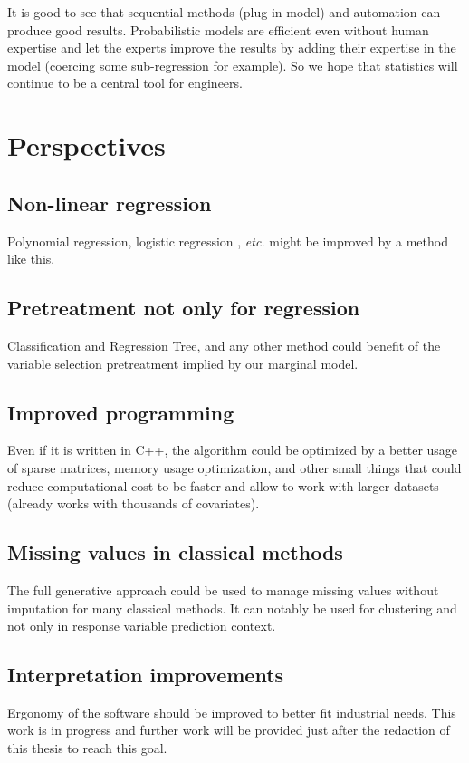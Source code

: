 \documentclass[12pt,a4paper]{report}
\begin{document}
			It is good to see that sequential methods (plug-in model) and automation can produce good results. Probabilistic models are efficient even without human expertise and let the experts improve the results by adding their expertise in the model (coercing some sub-regression for example). So we hope that statistics will continue to be a central tool for engineers.
		
		
	\section{Perspectives}
		\subsection{Non-linear regression}
			Polynomial regression, logistic regression \cite{hosmer2000applied}, {\it etc.} might be improved by a method like this.
		\subsection{Pretreatment not only for regression}
			Classification and Regression Tree, and any other method could benefit of the variable selection pretreatment implied by our marginal model.
		\subsection{Improved programming}
			Even if it is written in C++, the algorithm could be optimized by a better usage of sparse matrices, memory usage optimization, and other small things that could reduce computational cost to be faster and allow to work with larger datasets (already works with thousands of covariates).
		\subsection{Missing values in classical methods}
			The full generative approach could be used to manage missing values without imputation for many classical methods.
			It can notably be used for clustering and not only in response variable prediction context.
		\subsection{Interpretation improvements}
			Ergonomy of the software should be improved to better fit industrial needs. This work is in progress and further work will be provided just after the redaction of this thesis to reach this goal.
\cleardoublepage
\end{document}
